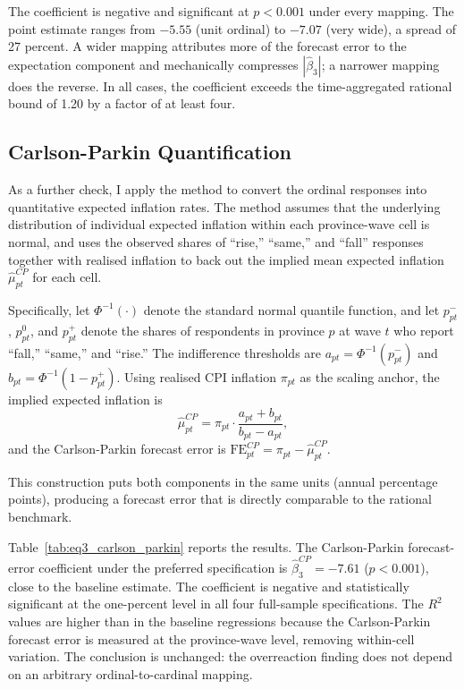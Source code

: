 The coefficient is negative and significant at $p < 0.001$
under every mapping.
The point estimate ranges from $-5.55$ (unit ordinal) to $-7.07$
(very wide), a spread of 27 percent.
A wider mapping attributes more of the forecast error to the
expectation component and mechanically compresses
$|\hat{\beta}_3|$; a narrower mapping does the reverse.
In all cases, the coefficient exceeds the time-aggregated
rational bound of 1.20 by a factor of at least four.

\subsection{Carlson-Parkin Quantification}\label{app:carlson_parkin}

As a further check, I apply the \citet{Carlson1975}
method to convert the ordinal responses into quantitative
expected inflation rates.
The method assumes that the underlying distribution of
individual expected inflation within each province-wave cell is
normal, and uses the observed shares of ``rise,'' ``same,'' and
``fall'' responses together with realised inflation to back out
the implied mean expected inflation $\hat{\mu}^{CP}_{pt}$ for
each cell.

Specifically, let $\Phi^{-1}(\cdot)$ denote the standard normal
quantile function, and let $p^{-}_{pt}$, $p^{0}_{pt}$, and
$p^{+}_{pt}$ denote the shares of respondents in province $p$
at wave $t$ who report ``fall,'' ``same,'' and ``rise.''
The indifference thresholds are
$a_{pt} = \Phi^{-1}(p^{-}_{pt})$ and
$b_{pt} = \Phi^{-1}(1 - p^{+}_{pt})$.
Using realised CPI inflation $\pi_{pt}$ as the scaling
anchor, the implied expected inflation is
\[
  \hat{\mu}^{CP}_{pt}
  = \pi_{pt} \cdot \frac{a_{pt} + b_{pt}}{b_{pt} - a_{pt}},
\]
and the Carlson-Parkin forecast error is
$\mathrm{FE}^{CP}_{pt} = \pi_{pt} - \hat{\mu}^{CP}_{pt}$.

This construction puts both components in the same units
(annual percentage points), producing a forecast error
that is directly comparable to the rational benchmark.



Table~\ref{tab:eq3_carlson_parkin} reports the results.
The Carlson-Parkin forecast-error coefficient under the
preferred specification is $\hat{\beta}_3^{CP} = -7.61$
($p < 0.001$), close to the baseline estimate.
The coefficient is negative and statistically significant at
the one-percent level in all four full-sample specifications.
The $R^2$ values are higher than in the baseline regressions
because the Carlson-Parkin forecast error is measured at the
province-wave level, removing within-cell variation.
The conclusion is unchanged: the overreaction finding does not
depend on an arbitrary ordinal-to-cardinal mapping.

